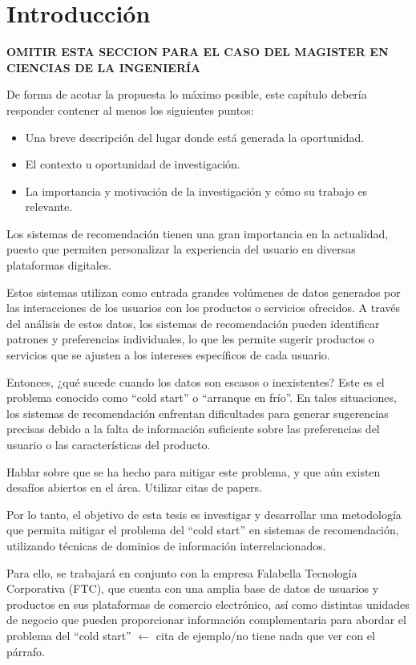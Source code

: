 \chapter{Introducción} %
\label{sec:Introduccion} %

\textbf{OMITIR ESTA SECCION PARA EL CASO DEL MAGISTER EN CIENCIAS DE LA INGENIER\'IA}

De forma de acotar la propuesta lo máximo posible, este capítulo debería responder contener al menos los siguientes puntos:
\begin{itemize}
\item Una breve descripción del lugar donde está generada la oportunidad.
\item El contexto u oportunidad de investigación.
\item La importancia y motivación de la investigación y cómo su trabajo es relevante.
\end{itemize}

\newpage
Los sistemas de recomendación tienen una gran importancia en la actualidad, puesto que permiten personalizar la experiencia del usuario en diversas plataformas digitales. 

Estos sistemas utilizan como entrada grandes volúmenes de datos generados por las interacciones de los usuarios con los productos o servicios ofrecidos. A través del análisis de estos datos, los sistemas de recomendación pueden identificar patrones y preferencias individuales, lo que les permite sugerir productos o servicios que se ajusten a los intereses específicos de cada usuario.

Entonces, ¿qué sucede cuando los datos son escasos o inexistentes? Este es el problema conocido como \enquote{cold start} o \enquote{arranque en frío}. En tales situaciones, los sistemas de recomendación enfrentan dificultades para generar sugerencias precisas debido a la falta de información suficiente sobre las preferencias del usuario o las características del producto.

Hablar sobre que se ha hecho para mitigar este problema, y que aún existen desafíos abiertos en el área. Utilizar citas de papers.

Por lo tanto, el objetivo de esta tesis es investigar y desarrollar una metodología que permita mitigar el problema del \enquote{cold start} en sistemas de recomendación, utilizando técnicas de dominios de información interrelacionados.

Para ello, se trabajará en conjunto con la empresa Falabella Tecnología Corporativa (FTC), que cuenta con una amplia base de datos de usuarios y productos en sus plataformas de comercio electrónico, así como distintas unidades de negocio que pueden proporcionar información complementaria para abordar el problema del \enquote{cold start} \cite{L__2012} $\leftarrow$ cita de ejemplo/no tiene nada que ver con el párrafo.